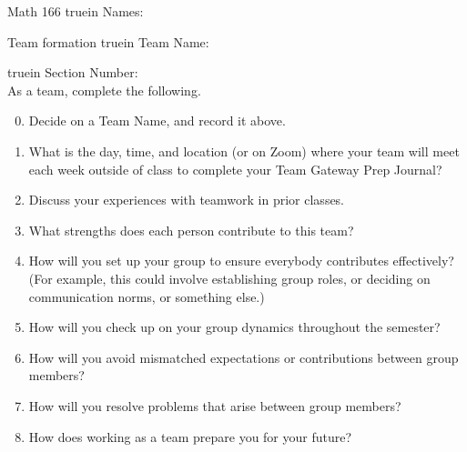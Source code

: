 \documentclass[12pt]{article}
\begin{document}
\pagestyle{empty} %

\noindent
{Math 166   truein  Names:\ \hrulefill}

\noindent
{Team formation  truein  Team Name:\ \hrulefill}

\noindent  {} truein  Section Number:\ \hrulefill
\ \\

\noindent As a team, complete the following.

\begin{enumerate}
\setcounter{enumi}{-1}

\item Decide on a Team Name, and record it above.
\vfill

\item What is the day, time, and location (or on Zoom) where your team will meet each week outside of class to complete your Team Gateway Prep Journal? 
\vfill
\item Discuss your experiences with teamwork in prior classes.
\vfill
\item What strengths does each person contribute to this team?
\vfill
\item How will you set up your group to ensure everybody contributes effectively?  (For example, this could involve establishing group roles, or deciding on communication norms, or something else.)
\vfill
\item How will you check up on your group dynamics throughout the semester?
\vfill
\item How will you avoid mismatched expectations or contributions between group members?
\vfill
\item How will you resolve problems that arise between group members?
\vfill
\item How does working as a team prepare you for your future?
\end{enumerate}
\end{document}
